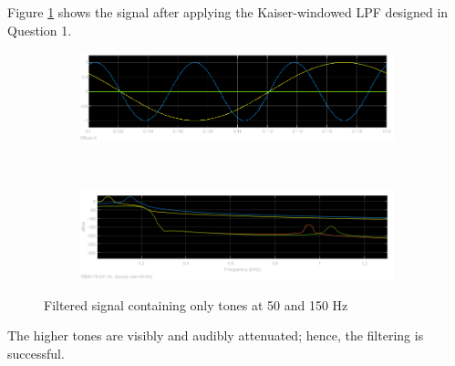 Figure \ref{fig:q9_filt} shows the signal after applying the Kaiser-windowed LPF designed in Question 1.

\begin{figure}[ht!]
    \centering
    \begin{subfigure}[b]{0.69\textwidth}
        \centering
        \includegraphics[width=\textwidth]{images/q9_filt_time.png}
    \end{subfigure}
    \\
    \begin{subfigure}[b]{0.7\textwidth}
        \centering
        \includegraphics[width=\textwidth]{images/q9_filt_freq.png}
    \end{subfigure}
    \caption{Filtered signal containing only tones at 50 and 150 Hz}
    \label{fig:q9_filt}
\end{figure}

The higher tones are visibly and audibly attenuated; hence, the filtering is successful.
